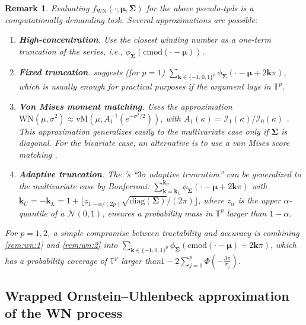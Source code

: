 \documentclass[oneside,11pt]{article}
\newcommand{\lp}{\left(}
\newcommand{\rp}{\right)}
\newcommand{\T}{\mathbb{T}}
\newcommand{\bmu}{\boldsymbol\mu}
\newcommand{\bk}{\mathbf{k}}
\newcommand{\Ical}{\mathcal{I}}
\newcommand{\bSigma}{\boldsymbol\Sigma}
\newcommand{\diag}[1]{\mathrm{diag}\lp #1\rp}
\newcommand{\cmod}[1]{\mathrm{cmod}\left(#1\right)}
\newtheorem{rem}{Remark}
\begin{document}
\begin{rem}
\label{rem:wn}
Evaluating $f_\mathrm{WN}(\cdot;\bmu,\bSigma)$ for the above pseudo-tpds is a computationally demanding task. Several approximations are possible:
\begin{enumerate}[label=\textit{\roman*}., ref=\textit{\roman*}]
\item \textbf{High-concentration}. Use the closest winding number as a one-term truncation of the series, \textit{i.e.}, \allowbreak$\phi_{\bSigma}(\cmod{\cdot-\bmu})$.\label{rem:wn:1}
\item \textbf{Fixed truncation}. \citet[page 50]{Mardia2000} suggests (for $p=1$) $\sum_{\bk\in\{-1,0,1\}^p}\phi_{\bSigma}(\cdot-\bmu+2\bk\pi)$, which is usually enough for practical purposes if the argument lays in $\T^p$.\label{rem:wn:2}
\item \textbf{Von Mises moment matching}. Uses the approximation $\mathrm{WN}(\mu,\sigma^2)\approx \mathrm{vM}(\mu,A_1^{-1}(e^{-\sigma^2/2}))$, with \allowbreak$A_1(\kappa)=\Ical_1(\kappa)/\Ical_0(\kappa)$ \citep[page 38]{Mardia2000}. This approximation generalizes easily to the multivariate case only if $\bSigma$ is diagonal. For the bivariate case, an alternative is to use a von Mises \emph{score} matching \citep{Mardia2017}.\label{rem:wn:3}
\item \textbf{Adaptive truncation}. The \cite{Jona-Lasinio2012}'s ``$3\sigma$ adaptive truncation'' can be generalized to the multivariate case by Bonferroni: $\sum_{\bk=\bk_L}^{\bk_U}\phi_{\bSigma}(\cdot-\bmu+2\bk\pi)$ with $\bk_U=-\bk_L=1+\lfloor z_{1-\alpha/(2p)}\sqrt{\diag{\bSigma}}\allowbreak/(2\pi)\rfloor$, where $z_{\alpha}$ is the upper $\alpha$-quantile of a $\mathcal{N}(0,1)$, ensures a probability mass in $\T^p$ larger than $1-\alpha$.\label{rem:wn:4}

\end{enumerate}
For $p=1,2$, a simple compromise between tractability and accuracy is combining \ref{rem:wn:1} and \ref{rem:wn:2} into $\sum_{\bk\in\{-1,0,1\}^p}\allowbreak\phi_{\bSigma}(\cmod{\cdot-\bmu}+2\bk\pi)$, which has a probability coverage of $\T^p$ larger than\linebreak $1-2\sum_{j=1}^p\Phi(-\tfrac{3\pi}{\sigma_j})$.
\end{rem}

\subsection{Wrapped Ornstein--Uhlenbeck approximation of the WN process}
\end{document}
